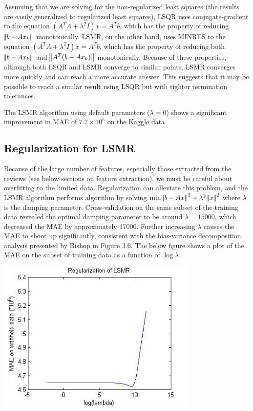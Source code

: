 \documentclass[11pt]{amsart}
\begin{document}
Assuming that we are solving for the non-regularized least squares (the results are easily generalized to regularized least squares), LSQR uses conjugate-gradient to the equation $(A^TA+\lambda^2I)x=A^Tb$, which has the property of reducing $\norm{b-Ax_k}$ monotonically. LSMR, on the other hand, uses MINRES to the equation $(A^TA+\lambda^2I)x=A^Tb$, which has the property of reducing both $\norm{b-Ax_k}$ and $\norm{A^T(b-Ax_k)}$ monotonically. Because of these properties, although both LSQR and LSMR converge to similar points, LSMR converges more quickly and can reach a more accurate answer. This suggests that it may be possible to reach a similar result using LSQR but with tighter termination tolerances.

The LSMR algorithm using default parameters ($\lambda=0$) shows a significant improvement in MAE of $7.7\times10^5$ on the Kaggle data.

\subsection{Regularization for LSMR}
Because of the large number of features, especially those extracted from the reviews (see below sections on feature extraction), we must be careful about overfitting to the limited data. Regularization can alleviate this problem, and the LSMR algorithm performs algorithm by solving $\text{min}\norm{b-Ax}^2+\lambda^2\norm{x}^2$ where $\lambda$ is the damping parameter. Cross-validation on the same subset of the training data revealed the optimal damping parameter to be around $\lambda=15000$, which decreased the MAE by approximately $17000$. Further increasing $\lambda$ causes the MAE to shoot up significantly, consistent with the bias-variance decomposition analysis presented by Bishop in Figure 3.6. The below figure shows a plot of the MAE on the subset of training data as a function of $\log{\lambda}$.

\begin{center}
\includegraphics[width=10cm]{LSMR-Regularization.jpg}
\end{center}
\end{document}
